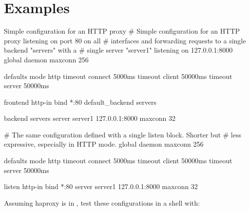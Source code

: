 \section{Examples}
\label{sec:examples}

\begin{example}{Simple configuration for an HTTP proxy}
    # Simple configuration for an HTTP proxy listening on port 80 on all
    # interfaces and forwarding requests to a single backend "servers" with a
    # single server "server1" listening on 127.0.0.1:8000
    global
        daemon
        maxconn 256

    defaults
        mode http
        timeout connect 5000ms
        timeout client 50000ms
        timeout server 50000ms

    frontend http-in
        bind *:80
        default_backend servers

    backend servers
        server server1 127.0.0.1:8000 maxconn 32


    # The same configuration defined with a single listen block. Shorter but
    # less expressive, especially in HTTP mode.
    global
        daemon
        maxconn 256

    defaults
        mode http
        timeout connect 5000ms
        timeout client 50000ms
        timeout server 50000ms

    listen http-in
        bind *:80
        server server1 127.0.0.1:8000 maxconn 32
\end{example}

Assuming haproxy is in , test these configurations in a shell with:

